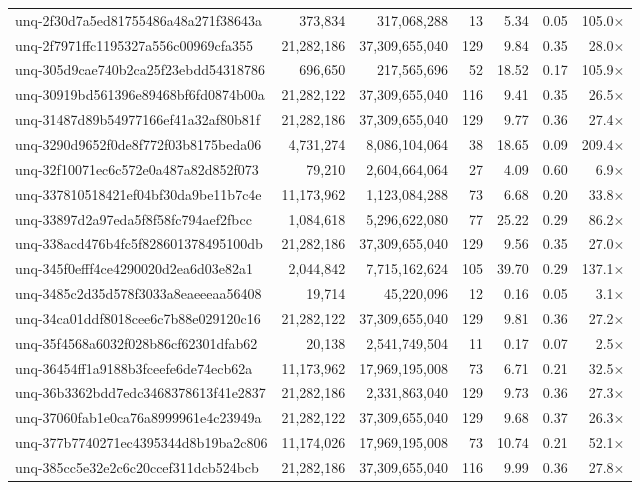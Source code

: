 \begin{table}[h!]
\begin{tabular}{lrrrrrr}
unq-2f30d7a5ed81755486a48a271f38643a & 373,834 & 317,068,288 & 13 & 5.34 & 0.05 & 105.0$\times$ \\
unq-2f7971ffc1195327a556c00969cfa355 & 21,282,186 & 37,309,655,040 & 129 & 9.84 & 0.35 & 28.0$\times$ \\
unq-305d9cae740b2ca25f23ebdd54318786 & 696,650 & 217,565,696 & 52 & 18.52 & 0.17 & 105.9$\times$ \\
unq-30919bd561396e89468bf6fd0874b00a & 21,282,122 & 37,309,655,040 & 116 & 9.41 & 0.35 & 26.5$\times$ \\
unq-31487d89b54977166ef41a32af80b81f & 21,282,186 & 37,309,655,040 & 129 & 9.77 & 0.36 & 27.4$\times$ \\
unq-3290d9652f0de8f772f03b8175beda06 & 4,731,274 & 8,086,104,064 & 38 & 18.65 & 0.09 & 209.4$\times$ \\
unq-32f10071ec6c572e0a487a82d852f073 & 79,210 & 2,604,664,064 & 27 & 4.09 & 0.60 & 6.9$\times$ \\
unq-337810518421ef04bf30da9be11b7c4e & 11,173,962 & 1,123,084,288 & 73 & 6.68 & 0.20 & 33.8$\times$ \\
unq-33897d2a97eda5f8f58fc794aef2fbcc & 1,084,618 & 5,296,622,080 & 77 & 25.22 & 0.29 & 86.2$\times$ \\
unq-338acd476b4fc5f828601378495100db & 21,282,186 & 37,309,655,040 & 129 & 9.56 & 0.35 & 27.0$\times$ \\
unq-345f0efff4ce4290020d2ea6d03e82a1 & 2,044,842 & 7,715,162,624 & 105 & 39.70 & 0.29 & 137.1$\times$ \\
unq-3485c2d35d578f3033a8eaeeeaa56408 & 19,714 & 45,220,096 & 12 & 0.16 & 0.05 & 3.1$\times$ \\
unq-34ca01ddf8018cee6c7b88e029120c16 & 21,282,122 & 37,309,655,040 & 129 & 9.81 & 0.36 & 27.2$\times$ \\
unq-35f4568a6032f028b86cf62301dfab62 & 20,138 & 2,541,749,504 & 11 & 0.17 & 0.07 & 2.5$\times$ \\
unq-36454ff1a9188b3fceefe6de74ecb62a & 11,173,962 & 17,969,195,008 & 73 & 6.71 & 0.21 & 32.5$\times$ \\
unq-36b3362bdd7edc3468378613f41e2837 & 21,282,186 & 2,331,863,040 & 129 & 9.73 & 0.36 & 27.3$\times$ \\
unq-37060fab1e0ca76a8999961e4c23949a & 21,282,122 & 37,309,655,040 & 129 & 9.68 & 0.37 & 26.3$\times$ \\
unq-377b7740271ec4395344d8b19ba2c806 & 11,174,026 & 17,969,195,008 & 73 & 10.74 & 0.21 & 52.1$\times$ \\
unq-385cc5e32e2c6c20ccef311dcb524bcb & 21,282,186 & 37,309,655,040 & 116 & 9.99 & 0.36 & 27.8$\times$ \\

\end{tabular}
\end{table}

